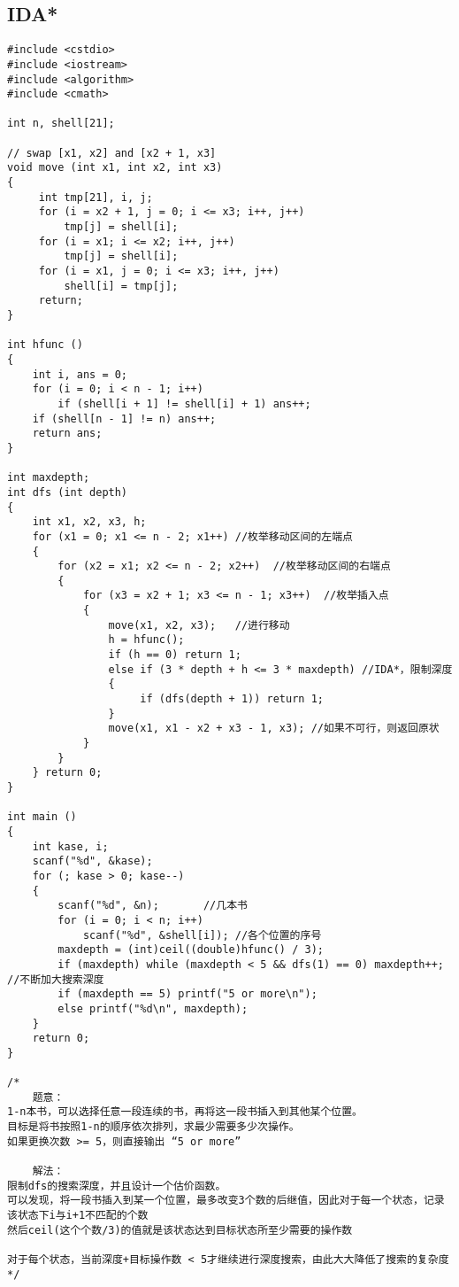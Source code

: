 \documentclass[twoside]{article}
\begin{document}
\subsection{IDA*}
\begin{lstlisting}
#include <cstdio>
#include <iostream>
#include <algorithm>
#include <cmath>

int n, shell[21];

// swap [x1, x2] and [x2 + 1, x3]
void move (int x1, int x2, int x3)
{
     int tmp[21], i, j;
     for (i = x2 + 1, j = 0; i <= x3; i++, j++)
         tmp[j] = shell[i];
     for (i = x1; i <= x2; i++, j++)
         tmp[j] = shell[i];
     for (i = x1, j = 0; i <= x3; i++, j++)
         shell[i] = tmp[j];
     return;
}

int hfunc ()
{
    int i, ans = 0;
    for (i = 0; i < n - 1; i++)
        if (shell[i + 1] != shell[i] + 1) ans++;
    if (shell[n - 1] != n) ans++;
    return ans;
}

int maxdepth;
int dfs (int depth)
{
    int x1, x2, x3, h;
    for (x1 = 0; x1 <= n - 2; x1++) //枚举移动区间的左端点
    {   
        for (x2 = x1; x2 <= n - 2; x2++)  //枚举移动区间的右端点
        {
            for (x3 = x2 + 1; x3 <= n - 1; x3++)  //枚举插入点
            {
                move(x1, x2, x3);   //进行移动
                h = hfunc();
                if (h == 0) return 1;
                else if (3 * depth + h <= 3 * maxdepth) //IDA*，限制深度
                {
                     if (dfs(depth + 1)) return 1;
                }
                move(x1, x1 - x2 + x3 - 1, x3); //如果不可行，则返回原状
            }
        }
    } return 0;
}

int main ()
{
    int kase, i;
    scanf("%d", &kase);
    for (; kase > 0; kase--)
    {
        scanf("%d", &n);       //几本书
        for (i = 0; i < n; i++)
            scanf("%d", &shell[i]); //各个位置的序号
        maxdepth = (int)ceil((double)hfunc() / 3);
        if (maxdepth) while (maxdepth < 5 && dfs(1) == 0) maxdepth++;   //不断加大搜索深度
        if (maxdepth == 5) printf("5 or more\n");
        else printf("%d\n", maxdepth);
    }
    return 0;
}

/*
    题意：
1-n本书，可以选择任意一段连续的书，再将这一段书插入到其他某个位置。
目标是将书按照1-n的顺序依次排列，求最少需要多少次操作。
如果更换次数 >= 5，则直接输出 “5 or more”

    解法：
限制dfs的搜索深度，并且设计一个估价函数。
可以发现，将一段书插入到某一个位置，最多改变3个数的后继值，因此对于每一个状态，记录该状态下i与i+1不匹配的个数
然后ceil(这个个数/3)的值就是该状态达到目标状态所至少需要的操作数

对于每个状态，当前深度+目标操作数 < 5才继续进行深度搜索，由此大大降低了搜索的复杂度
*/
\end{lstlisting}
\end{document}
